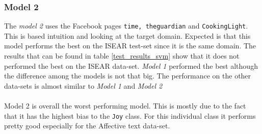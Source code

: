 \documentclass[
10pt, %
a4paper, %
oneside, %
headinclude,footinclude, %
BCOR5mm, %
]{scrartcl}
\begin{document}
\subsubsection{Model 2}
The \textit{model 2} uses the Facebook pages \texttt{time, theguardian} and \texttt{CookingLight}. This is based intuition and looking at the target domain. Expected is that this model performs the best on the ISEAR test-set since it is the same domain. The results that can be found in table \ref{test_results_svm} show that it does not performed the best on the ISEAR data-set. \textit{Model 1}  performed the best although the difference among the models is not that big. The performance on the other data-sets is almost similar to  \textit{Model 1} and \textit{Model 2}\\\\
Model 2 is overall the worst performing model. This is mostly due to the fact that it has the highest bias to the \texttt{Joy} class. For this individual class it performs pretty good especially for the Affective text data-set.
\end{document}
